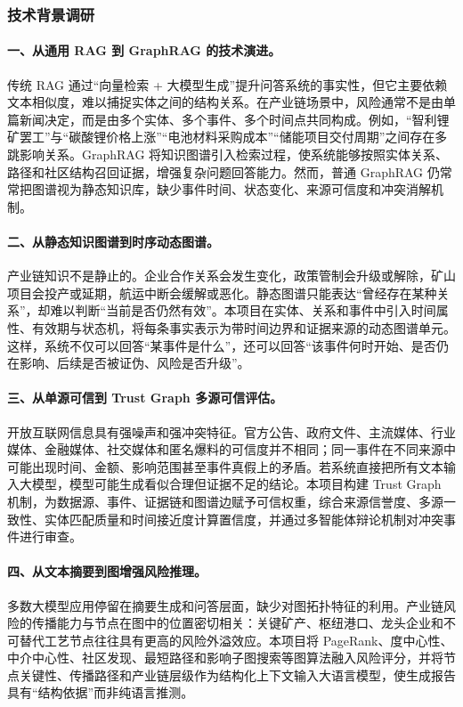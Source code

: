 ﻿\documentclass[12pt,a4paper]{article}
\begin{document}
\subsubsection{技术背景调研}

\paragraph{一、从通用 RAG 到 GraphRAG 的技术演进。}传统 RAG 通过“向量检索 + 大模型生成”提升问答系统的事实性，但它主要依赖文本相似度，难以捕捉实体之间的结构关系。在产业链场景中，风险通常不是由单篇新闻决定，而是由多个实体、多个事件、多个时间点共同构成。例如，“智利锂矿罢工”与“碳酸锂价格上涨”“电池材料采购成本”“储能项目交付周期”之间存在多跳影响关系。GraphRAG 将知识图谱引入检索过程，使系统能够按照实体关系、路径和社区结构召回证据，增强复杂问题回答能力。然而，普通 GraphRAG 仍常常把图谱视为静态知识库，缺少事件时间、状态变化、来源可信度和冲突消解机制。

\paragraph{二、从静态知识图谱到时序动态图谱。}产业链知识不是静止的。企业合作关系会发生变化，政策管制会升级或解除，矿山项目会投产或延期，航运中断会缓解或恶化。静态图谱只能表达“曾经存在某种关系”，却难以判断“当前是否仍然有效”。本项目在实体、关系和事件中引入时间属性、有效期与状态机，将每条事实表示为带时间边界和证据来源的动态图谱单元。这样，系统不仅可以回答“某事件是什么”，还可以回答“该事件何时开始、是否仍在影响、后续是否被证伪、风险是否升级”。

\paragraph{三、从单源可信到 Trust Graph 多源可信评估。}开放互联网信息具有强噪声和强冲突特征。官方公告、政府文件、主流媒体、行业媒体、金融媒体、社交媒体和匿名爆料的可信度并不相同；同一事件在不同来源中可能出现时间、金额、影响范围甚至事件真假上的矛盾。若系统直接把所有文本输入大模型，模型可能生成看似合理但证据不足的结论。本项目构建 Trust Graph 机制，为数据源、事件、证据链和图谱边赋予可信权重，综合来源信誉度、多源一致性、实体匹配质量和时间接近度计算置信度，并通过多智能体辩论机制对冲突事件进行审查。

\paragraph{四、从文本摘要到图增强风险推理。}多数大模型应用停留在摘要生成和问答层面，缺少对图拓扑特征的利用。产业链风险的传播能力与节点在图中的位置密切相关：关键矿产、枢纽港口、龙头企业和不可替代工艺节点往往具有更高的风险外溢效应。本项目将 PageRank、度中心性、中介中心性、社区发现、最短路径和影响子图搜索等图算法融入风险评分，并将节点关键性、传播路径和产业链层级作为结构化上下文输入大语言模型，使生成报告具有“结构依据”而非纯语言推测。
\end{document}

